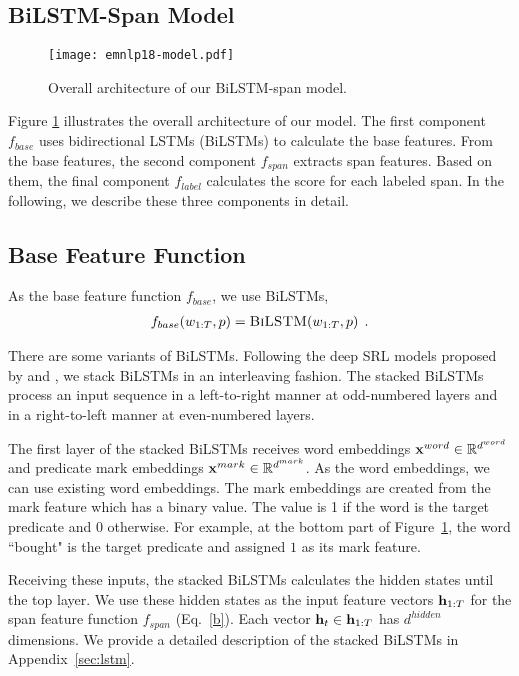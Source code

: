 \documentclass[11pt,a4paper]{article}
\begin{document}
\subsection{BiLSTM-Span Model}
\label{sec:bilstm}
\begin{figure}[t]
  \begin{center}
   \texttt{[image: emnlp18-model.pdf]}
  \caption{Overall architecture of our BiLSTM-span model.}
  \label{fig:model}
  \end{center}
\end{figure}

Figure \ref{fig:model} illustrates the overall architecture of our model.
The first component $f_{base}$ uses bidirectional LSTMs (BiLSTMs) \cite{schuster:97,graves:05,graves:13} to calculate the base features.
From the base features, the second component $f_{span}$ extracts span features.
Based on them, the final component $f_{label}$ calculates the score for each labeled span.
In the following, we describe these three components in detail. 

\subsection*{Base Feature Function}
As the base feature function $f_{base}$, we use BiLSTMs,
\begin{align*}
f_{base}(w_{1:T}, p) = \textsc{BiLSTM}(w_{1:T}, p) \:\: .
\end{align*}

\noindent
There are some variants of BiLSTMs.
Following the deep SRL models proposed by  and , we stack BiLSTMs in an interleaving fashion.
The stacked BiLSTMs process an input sequence in a left-to-right manner at odd-numbered layers and in a right-to-left manner at even-numbered layers.

The first layer of the stacked BiLSTMs receives word embeddings ${\bf x}^{word} \in \mathbb{R}^{d^{word}}$ and predicate mark embeddings ${\bf x}^{mark} \in \mathbb{R}^{d^{mark}}$.
As the word embeddings, we can use existing word embeddings.
The mark embeddings are created from the mark feature which has a binary value.
The value is 1 if the word is the target predicate and 0 otherwise.
For example, at the bottom part of Figure~\ref{fig:model}, the word ``bought" is the target predicate and assigned $1$ as its mark feature.

Receiving these inputs, the stacked BiLSTMs calculates the hidden states until the top layer.
We use these hidden states as the input feature vectors ${\bf h}_{1:T}$ for the span feature function $f_{span}$ (Eq.~\ref{b}).
Each vector ${\bf h}_t \in {\bf h}_{1:T}$ has $d^{hidden}$ dimensions.
We provide a detailed description of the stacked BiLSTMs in Appendix~\ref{sec:lstm}.
\end{document}
